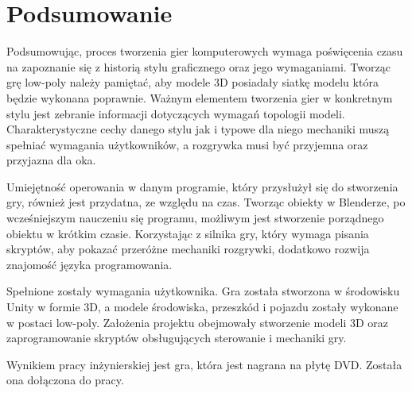 \chapter{Podsumowanie}

\indent Podsumowując, proces tworzenia gier komputerowych wymaga poświęcenia czasu na zapoznanie się z historią stylu graficznego oraz jego wymaganiami. Tworząc grę low-poly należy pamiętać, aby modele 3D posiadały siatkę modelu która będzie wykonana poprawnie. Ważnym elementem tworzenia gier w konkretnym stylu jest zebranie informacji dotyczących wymagań topologii modeli. Charakterystyczne cechy danego stylu jak i typowe dla niego mechaniki muszą spełniać wymagania użytkowników, a rozgrywka musi być przyjemna oraz przyjazna dla oka.

\indent Umiejętność operowania w danym programie, który przysłużył się do stworzenia gry, również jest przydatna, ze względu na czas. Tworząc obiekty w Blenderze, po wcześniejszym nauczeniu się programu, możliwym jest stworzenie porządnego obiektu w krótkim czasie. Korzystając z silnika gry, który wymaga pisania skryptów, aby pokazać przeróżne mechaniki rozgrywki, dodatkowo rozwija znajomość języka programowania. 

\indent Spełnione zostały wymagania użytkownika. Gra została stworzona w środowisku Unity w formie 3D, a modele środowiska, przeszkód i pojazdu zostały wykonane w postaci low-poly. Założenia projektu obejmowały stworzenie modeli 3D oraz zaprogramowanie skryptów obsługujących sterowanie i mechaniki gry. 

\indent Wynikiem pracy inżynierskiej jest gra, która jest nagrana na płytę DVD. Została ona dołączona do pracy.
